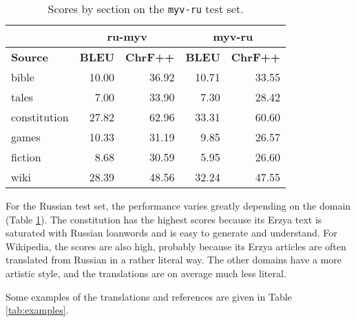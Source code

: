 \documentclass[11pt]{article}
\begin{document}
\begin{table}
\small
\centering
\begin{tabular}{l|rr|rr}
\hline
 & \multicolumn{2}{c|}{ru-myv} & \multicolumn{2}{c}{myv-ru} \\
 \hline
\textbf{Source} & \textbf{BLEU} & \textbf{ChrF++} & \textbf{BLEU} & \textbf{ChrF++} \\
\hline
bible                & 10.00 & 36.92 & 10.71 & 33.55 \\
tales                &  7.00 & 33.90 &  7.30 & 28.42 \\
constitution         & 27.82 & 62.96 & 33.31 & 60.60 \\
games                & 10.33 & 31.19 &  9.85 & 26.57 \\
fiction              &  8.68 & 30.59 &  5.95 & 26.60 \\
wiki                 & 28.39 & 48.56 & 32.24 & 47.55 \\
\hline
\end{tabular}
\caption{\label{tab:bleu_ru} Scores by section on the \texttt{myv-ru} test set.}
\end{table}

For the Russian test set, the performance varies greatly depending on the domain (Table \ref{tab:bleu_ru}). The constitution has the highest scores because its Erzya text is saturated with Russian loanwords and is easy to generate and understand. For Wikipedia, the scores are also high, probably because its Erzya articles are often translated from Russian in a rather literal way. The other domains have a more artistic style, and the translations are on average much less literal.

Some examples of the translations and references are given in Table \ref{tab:examples}.
\end{document}
